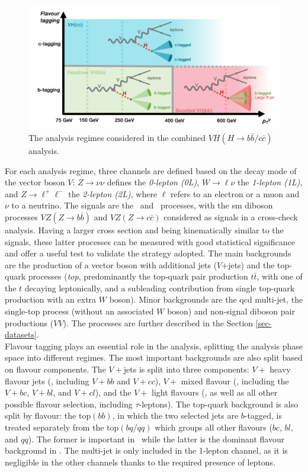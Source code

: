 \begin{figure}[h!]
\center
\includegraphics[width=\textwidth]{Images/VH/Cat/AnalysisRegime.png}
\caption{The analysis regimes considered in the combined $VH (H\rightarrow b\bar{b}/c\bar{c})$ analysis.} 
\label{fig:ana-strat}
\end{figure}

For each analysis regime, three channels are defined based on the decay mode of the vector boson $V$: $Z \rightarrow \nu \nu$ defines the \textit{0-lepton (0L)}, $W \rightarrow \ell \nu $ the \textit{1-lepton (1L)}, and $Z \rightarrow\ell^+\ell^-$ the \textit{2-lepton (2L)}, where $\ell$ refers to an electron or a muon and $\nu$ to a neutrino. The signals are the \vhb\ and \vhc\ processes, with the \gls{sm} diboson processes $VZ (Z\rightarrow b\bar{b})$ and $VZ (Z\rightarrow c\bar{c})$ considered as signals in a cross-check analysis. Having a larger cross section and being kinematically similar to the signals, these latter processes can be measured with good statistical significance and offer a useful test to validate the strategy adopted. The main backgrounds are the production of a vector boson with additional jets ($V$+jets) and the top-quark processes (\textit{top}, predominantly the top-quark pair production $t\bar{t}$, with one of the $t$ decaying leptonically, and a subleading contribution from single top-quark production with an extra $W$ boson). Minor backgrounds are the \gls{qcd} multi-jet, the single-top process (without an associated $W$ boson) and non-signal diboson pair productions ($VV$). The processes are further described in the Section \ref{sec-datasets}. \\ 

Flavour tagging plays an essential role in the analysis, splitting the analysis phase space into different regimes. The most important backgrounds are also split based on flavour components. The $V+$jets is split into three components: $V+$ heavy flavour jets (\vhf, including $V+bb$ and $V+cc$), $V+$ mixed flavour (\vmf, including the $V+bc$, $V+bl$, and $V+cl$), and the $V+$ light flavours (\vlf, as well as all other possible flavour selection, including $\tau$-leptons). The top-quark background is also split by flavour: the top$(bb)$, in which the two selected jets are $b$-tagged, is treated separately from the top$(bq/qq)$ which groups all other flavours ($bc$, $bl$, and $qq$). The former is important in \vhb\ while the latter is the dominant flavour background in \vhc. The multi-jet is only included in the 1-lepton channel, as it is negligible in the other channels thanks to the required presence of leptons. \\

